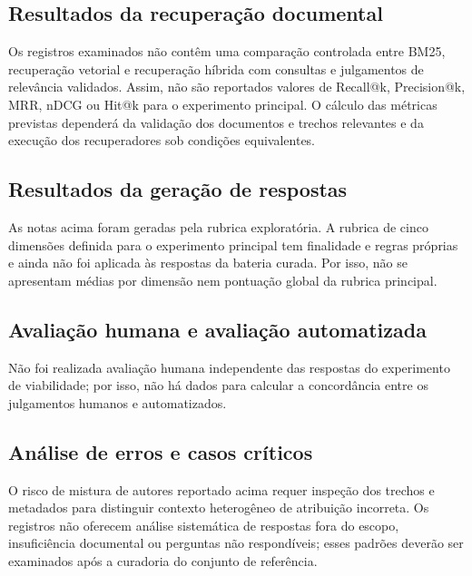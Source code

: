 \subsection{Resultados da recuperação documental}

Os registros examinados não contêm uma comparação controlada entre BM25, recuperação vetorial e recuperação híbrida com consultas e julgamentos de relevância validados. Assim, não são reportados valores de Recall@k, Precision@k, MRR, nDCG ou Hit@k para o experimento principal. O cálculo das métricas previstas dependerá da validação dos documentos e trechos relevantes e da execução dos recuperadores sob condições equivalentes.

\subsection{Resultados da geração de respostas}

As notas acima foram geradas pela rubrica exploratória. A rubrica de cinco dimensões definida para o experimento principal tem finalidade e regras próprias e ainda não foi aplicada às respostas da bateria curada. Por isso, não se apresentam médias por dimensão nem pontuação global da rubrica principal.

\subsection{Avaliação humana e avaliação automatizada}

Não foi realizada avaliação humana independente das respostas do experimento de viabilidade; por isso, não há dados para calcular a concordância entre os julgamentos humanos e automatizados.

\subsection{Análise de erros e casos críticos}

O risco de mistura de autores reportado acima requer inspeção dos trechos e metadados para distinguir contexto heterogêneo de atribuição incorreta. Os registros não oferecem análise sistemática de respostas fora do escopo, insuficiência documental ou perguntas não respondíveis; esses padrões deverão ser examinados após a curadoria do conjunto de referência.
